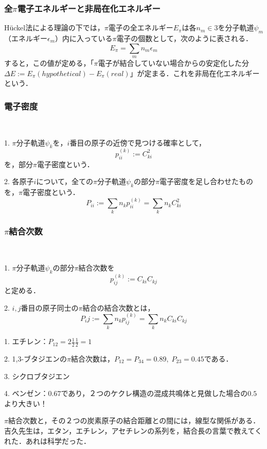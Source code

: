 \documentclass[uplatex, dvipdfmx]{jsreport}
\begin{document}
\subsubsection{全$\pi$電子エネルギーと非局在化エネルギー}

\begin{definition}[$\pi$電子の全エネルギー]
    Hückel法による理論の下では，$\pi$電子の全エネルギー$E_\pi$は各$n_m\in 3$を分子軌道$\psi_m$（エネルギー$\epsilon_m$）内に入っている$\pi$電子の個数として，次のように表される．
    \[ E_\pi =\sum_mn_m\epsilon_m \]
    すると，この値が定める，「$\pi$電子が結合していない場合からの安定化した分$\Delta E:=E_\pi(hypothetical)-E_\pi(real)$」が定まる．これを非局在化エネルギーという．
\end{definition}

\subsubsection{電子密度}

\begin{definition}[$\pi$電子密度]　

    1. $\pi$分子軌道$\psi_k$を，$i$番目の原子の近傍で見つける確率として，
    \[ p_{ii}^{(k)}:=C_{ki}^2\]
    を，部分$\pi$電子密度という．

    2. 各原子$i$について，全ての$\pi$分子軌道$\psi_k$の部分$\pi$電子密度を足し合わせたものを，$\pi$電子密度という．
    \[ P_{ii}:=\sum_kn_kp_{ii}^{(k)}=\sum_kn_kC^2_{ki} \]
\end{definition}

\subsubsection{$\pi$結合次数}

\begin{definition}　

    1. $\pi$分子軌道$\psi_k$の部分$\pi$結合次数を
    \[ p_{ij}^{(k)}:=C_{ki}C_{kj} \]
    と定める．

    2. $i,j$番目の原子同士の$\pi$結合の結合次数とは，
    \[ P_ij:=\sum_kn_kp_{ij}^{(k)}=\sum_kn_kC_{ki}C_{kj} \]
\end{definition}
\begin{example}
    1. エチレン：$P_{12}=2\frac{1}{2}\frac{1}{2}=1$

    2. 1,3-ブタジエンの$\pi$結合次数は，$P_{12}=P_{34}=0.89,\; P_{23}=0.45$である．

    3. シクロブタジエン

    4. ベンゼン：$0.67$であり，２つのケクレ構造の混成共鳴体と見做した場合の$0.5$より大きい！
\end{example}
\begin{remark}
    $\pi$結合次数と，その２つの炭素原子の結合距離との間には，線型な関係がある．吉久先生は，エタン，エチレン，アセチレンの系列を，結合長の言葉で教えてくれた．あれは科学だった．
\end{remark}
\end{document}
